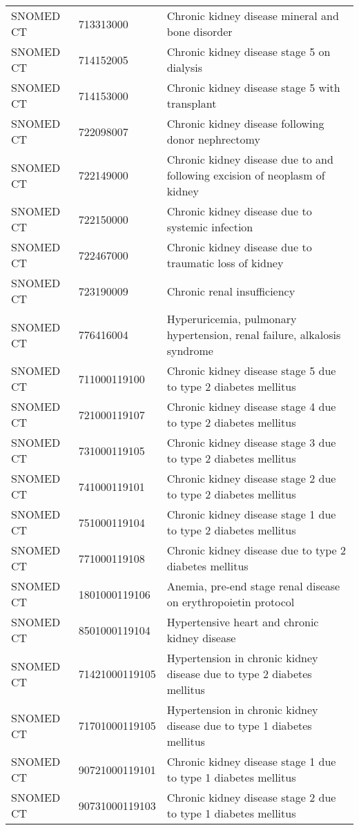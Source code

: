 \begin{table}[ht]
\begin{tabular}{lll}
  SNOMED CT & 713313000 & Chronic kidney disease mineral and bone disorder \\ 
  SNOMED CT & 714152005 & Chronic kidney disease stage 5 on dialysis \\ 
  SNOMED CT & 714153000 & Chronic kidney disease stage 5 with transplant \\ 
  SNOMED CT & 722098007 & Chronic kidney disease following donor nephrectomy \\ 
  SNOMED CT & 722149000 & Chronic kidney disease due to and following excision of neoplasm of kidney \\ 
  SNOMED CT & 722150000 & Chronic kidney disease due to systemic infection \\ 
  SNOMED CT & 722467000 & Chronic kidney disease due to traumatic loss of kidney \\ 
  SNOMED CT & 723190009 & Chronic renal insufficiency \\ 
  SNOMED CT & 776416004 & Hyperuricemia, pulmonary hypertension, renal failure, alkalosis syndrome \\ 
  SNOMED CT & 711000119100 & Chronic kidney disease stage 5 due to type 2 diabetes mellitus \\ 
  SNOMED CT & 721000119107 & Chronic kidney disease stage 4 due to type 2 diabetes mellitus \\ 
  SNOMED CT & 731000119105 & Chronic kidney disease stage 3 due to type 2 diabetes mellitus \\ 
  SNOMED CT & 741000119101 & Chronic kidney disease stage 2 due to type 2 diabetes mellitus \\ 
  SNOMED CT & 751000119104 & Chronic kidney disease stage 1 due to type 2 diabetes mellitus \\ 
  SNOMED CT & 771000119108 & Chronic kidney disease due to type 2 diabetes mellitus \\ 
  SNOMED CT & 1801000119106 & Anemia, pre-end stage renal disease on erythropoietin protocol \\ 
  SNOMED CT & 8501000119104 & Hypertensive heart and chronic kidney disease \\ 
  SNOMED CT & 71421000119105 & Hypertension in chronic kidney disease due to type 2 diabetes mellitus \\ 
  SNOMED CT & 71701000119105 & Hypertension in chronic kidney disease due to type 1 diabetes mellitus \\ 
  SNOMED CT & 90721000119101 & Chronic kidney disease stage 1 due to type 1 diabetes mellitus \\ 
  SNOMED CT & 90731000119103 & Chronic kidney disease stage 2 due to type 1 diabetes mellitus \\ 

\end{tabular}
\end{table}
